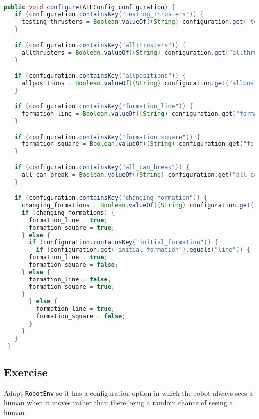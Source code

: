 \begin{ourexample}
  \label{code:config} \quad \\
\begin{lstlisting}[basicstyle=\sffamily,language=Java,style=easslisting]
 public void configure(AILConfig configuration) {
   if (configuration.containsKey("testing_thrusters")) {
     testing_thrusters = Boolean.valueOf((String) configuration.get("testing_thrusters"));
   }

   if (configuration.containsKey("allthrusters")) {
     allthrusters = Boolean.valueOf((String) configuration.get("allthrusters"));
   }

   if (configuration.containsKey("allpositions")) {
     allpositions = Boolean.valueOf((String) configuration.get("allpositions");
   }

   if (configuration.containsKey("formation_line")) {
     formation_line = Boolean.valueOf((String) configuration.get("formation_line"));
   }

   if (configuration.containsKey("formation_square")) {
     formation_square = Boolean.valueOf((String) configuration.get("formation_square");
   }

   if (configuration.containsKey("all_can_break")) {
     all_can_break = Boolean.valueOf((String) configuration.get("all_can_break"));
   }

   if (configuration.containsKey("changing_formation")) {
     changing_formations = Boolean.valueOf((String) configuration.get("changing_formations"));
     if (changing_formations) {
       formation_line = true;
       formation_square = true;
     } else {
       if (configuration.containsKey("initial_formation")) {
         if (configuration.get("initial_formation").equals("line")) {
 	   formation_line = true;
	   formation_square = false;
	 } else {
	   formation_line = false;
	   formation_square = true;
	 }
       } else {
         formation_line = true;
         formation_square = false;
       }
     }
   }
 }
\end{lstlisting}
\end{ourexample}

\subsection{Exercise}
Adapt \texttt{RobotEnv} so it has a configuration option in which the robot always sees a human when it moves rather than there being a random chance of seeing a human. 

